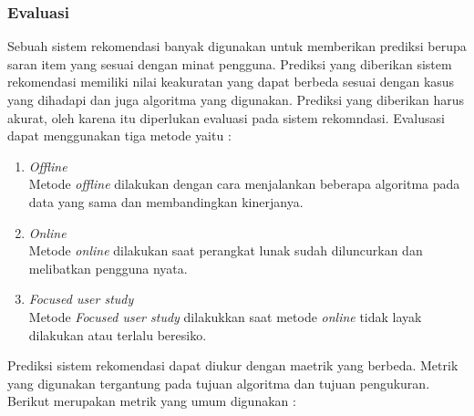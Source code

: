 \subsubsection{Evaluasi}
Sebuah sistem rekomendasi banyak digunakan untuk memberikan prediksi berupa saran item yang sesuai dengan minat pengguna. Prediksi yang diberikan sistem rekomendasi memiliki nilai keakuratan yang dapat berbeda sesuai dengan kasus yang dihadapi dan juga algoritma yang digunakan. Prediksi yang diberikan harus akurat, oleh karena itu diperlukan evaluasi pada sistem rekomndasi. Evalusasi dapat menggunakan tiga metode \cite{buku:sistem:rekomendasi} yaitu :

\begin{enumerate}
	\item \textit{Offline}\\
		Metode \textit{offline} dilakukan dengan cara menjalankan beberapa algoritma pada data yang sama dan membandingkan kinerjanya.

	\item \textit{Online}\\
		Metode \textit{online} dilakukan saat perangkat lunak sudah diluncurkan dan melibatkan pengguna nyata. 
		
	\item \textit{Focused user study}\\
		Metode \textit{Focused user study} dilakukkan saat metode \textit{online} tidak layak dilakukan atau terlalu beresiko.
	
\end{enumerate}

Prediksi sistem rekomendasi dapat diukur dengan maetrik yang berbeda. Metrik yang digunakan tergantung pada tujuan algoritma dan tujuan pengukuran. Berikut merupakan metrik yang umum digunakan \cite{evaluation} :

